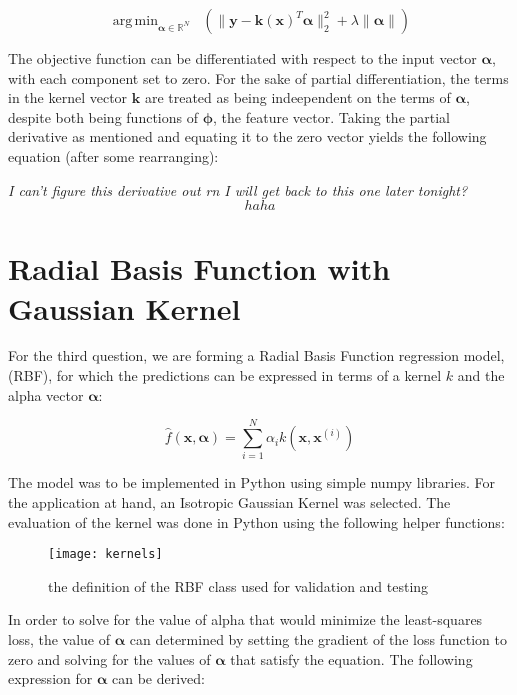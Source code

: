 \documentclass{article}
\DeclareMathOperator*{\argmin}{arg\,min}
\begin{document}
\begin{equation}
\argmin_{\boldsymbol\alpha \in \mathbb{R}^N} \;\; (\| \mathbf{y} - \mathbf{k(x)}^T\boldsymbol\alpha \|_{2}^2 + \lambda \|\boldsymbol\alpha \|)
\end{equation}

The objective function can be differentiated with respect to the input vector $\boldsymbol\alpha$, with each component set to zero. For the sake of partial differentiation, the terms in the kernel vector $\mathbf{k}$ are treated as being indeependent on the terms of $\boldsymbol\alpha$, despite both being functions of $\boldsymbol\phi$, the feature vector. Taking the partial derivative as mentioned and equating it to the zero vector yields the following equation (after some rearranging):

\textit{I can't figure this derivative out rn I will get back to this one later tonight?}
\begin{equation}
haha
\end{equation}

\iffalse
\section{Radial Basis Function with Gaussian Kernel}
For the third question, we are forming a Radial Basis Function regression model, (RBF), for which the predictions can be expressed in terms of a kernel $k$ and the alpha vector $\boldsymbol\alpha$:

\begin{equation}
\hat{f}(\mathbf{x}, \boldsymbol\alpha) = \sum_{i=1}^{N} \alpha_i k(\mathbf{x}, \mathbf{x}^{(i)})
\end{equation}

The model was to be implemented in Python using simple numpy libraries. For the application at hand, an Isotropic Gaussian Kernel was selected. The evaluation of the kernel was done in Python using the following helper functions:


\begin{figure}[H]
\centering
\texttt{[image: kernels]}
\caption{the definition of the RBF class used for validation and testing}
\end{figure}

 In order to solve for the value of alpha that would minimize the least-squares loss, the value of $\boldsymbol\alpha$ can determined by setting the gradient of the loss function to zero and solving for the values of $\boldsymbol\alpha$ that satisfy the equation. The following expression for $\boldsymbol\alpha$ can be derived:
\end{document}
